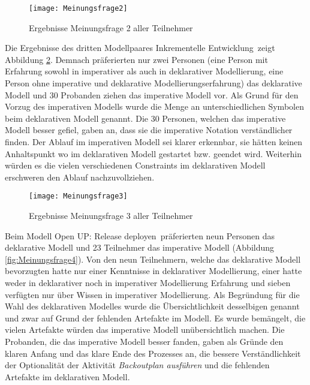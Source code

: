 \begin{figure}[htp]
\begin{center}
  \texttt{[image: Meinungsfrage2]} %
  \caption{Ergebnisse Meinungsfrage 2 aller Teilnehmer}
  \label{fig:Meinungsfrage2}
\end{center}
\end{figure}

Die Ergebnisse des dritten Modellpaares \grqq Inkrementelle Entwicklung\grqq \ zeigt Abbildung \ref{fig:Meinungsfrage3}. Demnach präferierten nur zwei Personen (eine Person mit Erfahrung sowohl in imperativer als auch in deklarativer Modellierung, eine Person ohne imperative und deklarative Modellierungserfahrung) das deklarative Modell und 30 Probanden ziehen das imperative Modell vor.\newline
Als Grund für den Vorzug des imperativen Modells wurde die Menge an unterschiedlichen Symbolen beim deklarativen Modell genannt. \newline
Die 30 Personen, welchen das imperative Modell besser gefiel, gaben an, dass sie die imperative Notation verständlicher finden. Der Ablauf im imperativen Modell sei klarer erkennbar, sie hätten keinen Anhaltspunkt wo im deklarativen Modell gestartet bzw. geendet wird. Weiterhin würden es die vielen verschiedenen Constraints im deklarativen Modell erschweren den Ablauf nachzuvollziehen.\newline

\begin{figure}[htp]
\begin{center}
  \texttt{[image: Meinungsfrage3]} %
  \caption{Ergebnisse Meinungsfrage 3 aller Teilnehmer}
  \label{fig:Meinungsfrage3}
\end{center}
\end{figure}

Beim Modell \grqq Open UP: Release deployen\grqq \ präferierten neun Personen das deklarative Modell und 23 Teilnehmer das imperative Modell (Abbildung \ref{fig:Meinungsfrage4}). Von den neun Teilnehmern, welche das deklarative Modell bevorzugten hatte nur einer Kenntnisse in deklarativer Modellierung, einer hatte weder in deklarativer noch in imperativer Modellierung Erfahrung und sieben verfügten nur über Wissen in imperativer Modellierung. \newline
Als Begründung für die Wahl des deklarativen Modelles wurde die Übersichtlichkeit desselbigen genannt und zwar auf Grund der fehlenden Artefakte im Modell. Es wurde bemängelt, die vielen Artefakte würden das imperative Modell unübersichtlich machen.\newline
Die Probanden, die das imperative Modell besser fanden, gaben als Gründe den klaren Anfang und das klare Ende des Prozesses an, die bessere Verständlichkeit der Optionalität der Aktivität \textit{Backoutplan ausführen} und die fehlenden Artefakte im deklarativen Modell. \newline



